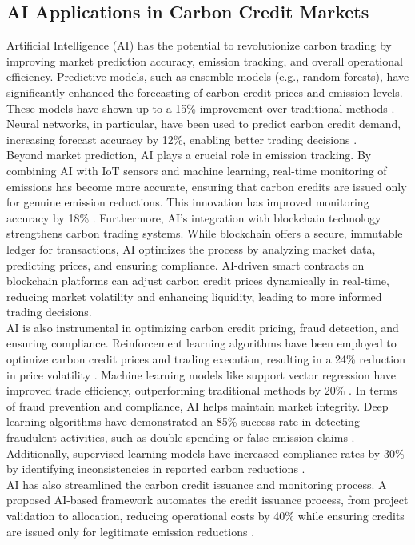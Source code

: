 \documentclass[preprint,12pt]{elsarticle}
\begin{document}
\subsection{AI Applications in Carbon Credit Markets}
Artificial Intelligence (AI) has the potential to revolutionize carbon trading by improving market prediction accuracy, emission tracking, and overall operational efficiency. Predictive models, such as ensemble models (e.g., random forests), have significantly enhanced the forecasting of carbon credit prices and emission levels. These models have shown up to a 15\% improvement over traditional methods \citep{zhang2020ai}. Neural networks, in particular, have been used to predict carbon credit demand, increasing forecast accuracy by 12\%, enabling better trading decisions \citep{Gao2022predicting}.\\
Beyond market prediction, AI plays a crucial role in emission tracking. By combining AI with IoT sensors and machine learning, real-time monitoring of emissions has become more accurate, ensuring that carbon credits are issued only for genuine emission reductions. This innovation has improved monitoring accuracy by 18\% \citep{Cheng2021ai}. Furthermore, AI's integration with blockchain technology strengthens carbon trading systems. While blockchain offers a secure, immutable ledger for transactions, AI optimizes the process by analyzing market data, predicting prices, and ensuring compliance. AI-driven smart contracts on blockchain platforms can adjust carbon credit prices dynamically in real-time, reducing market volatility and enhancing liquidity, leading to more informed trading decisions.\\
AI is also instrumental in optimizing carbon credit pricing, fraud detection, and ensuring compliance. Reinforcement learning algorithms have been employed to optimize carbon credit prices and trading execution, resulting in a 24\% reduction in price volatility \citep{zhao2021optimizing}. Machine learning models like support vector regression have improved trade efficiency, outperforming traditional methods by 20\% \citep{xu2020enhancing}. In terms of fraud prevention and compliance, AI helps maintain market integrity. Deep learning algorithms have demonstrated an 85\% success rate in detecting fraudulent activities, such as double-spending or false emission claims \citep{chen2021fraud}. Additionally, supervised learning models have increased compliance rates by 30\% by identifying inconsistencies in reported carbon reductions \citep{wang2022detecting}.\\
AI has also streamlined the carbon credit issuance and monitoring process. A proposed AI-based framework automates the credit issuance process, from project validation to allocation, reducing operational costs by 40\% while ensuring credits are issued only for legitimate emission reductions \citep{Li2022ai}.
\end{document}
